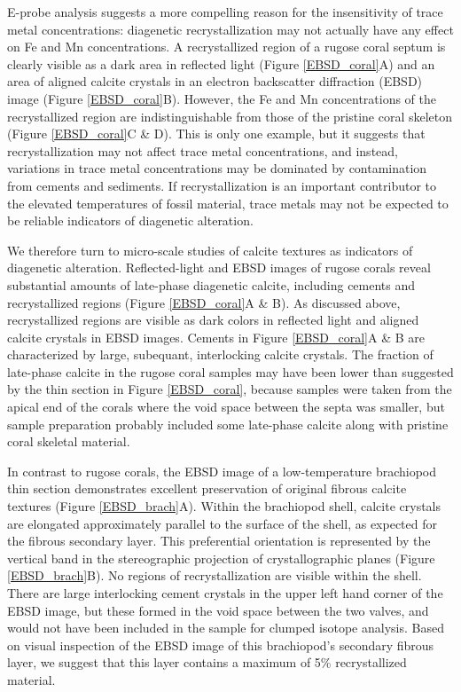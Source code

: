 \documentclass{article}
\begin{document}
E-probe analysis suggests a more compelling reason for the insensitivity of trace metal concentrations: diagenetic recrystallization may not actually have any effect on Fe and Mn concentrations. A recrystallized region of a rugose coral septum is clearly visible as a dark area in reflected light (Figure \ref{EBSD_coral}A) and an area of aligned calcite crystals in an electron backscatter diffraction (EBSD) image (Figure \ref{EBSD_coral}B). However, the Fe and Mn concentrations of the recrystallized region are indistinguishable from those of the pristine coral skeleton (Figure \ref{EBSD_coral}C \& D). This is only one example, but it suggests that recrystallization may not affect trace metal concentrations, and instead, variations in trace metal concentrations may be dominated by contamination from cements and sediments. If recrystallization is an important contributor to the elevated temperatures of fossil material, trace metals may not be expected to be reliable indicators of diagenetic alteration.

We therefore turn to micro-scale studies of calcite textures as indicators of diagenetic alteration. Reflected-light and EBSD images of rugose corals reveal substantial amounts of late-phase diagenetic calcite, including cements and recrystallized regions (Figure \ref{EBSD_coral}A \& B). As discussed above, recrystallized regions are visible as dark colors in reflected light and aligned calcite crystals in EBSD images. Cements in Figure \ref{EBSD_coral}A \& B are characterized by large, subequant, interlocking calcite crystals. The fraction of late-phase calcite in the rugose coral samples may have been lower than suggested by the thin section in Figure \ref{EBSD_coral}, because samples were taken from the apical end of the corals where the void space between the septa was smaller, but sample preparation probably included some late-phase calcite along with pristine coral skeletal material. 

In contrast to rugose corals, the EBSD image of a low-temperature brachiopod thin section demonstrates excellent preservation of original fibrous calcite textures (Figure \ref{EBSD_brach}A). Within the brachiopod shell, calcite crystals are elongated approximately parallel to the surface of the shell, as expected for the fibrous secondary layer. This preferential orientation is represented by the vertical band in the stereographic projection of crystallographic planes (Figure \ref{EBSD_brach}B). No regions of recrystallization are visible within the shell. There are large interlocking cement crystals in the upper left hand corner of the EBSD image, but these formed in the void space between the two valves, and would not have been included in the sample for clumped isotope analysis. Based on visual inspection of the EBSD image of this brachiopod's secondary fibrous layer, we suggest that this layer contains a maximum of 5\% recrystallized material. 
\end{document}
